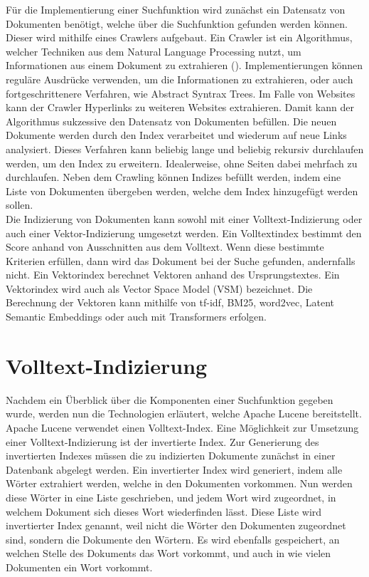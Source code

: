 Für die Implementierung einer Suchfunktion wird zunächst ein Datensatz von Dokumenten benötigt, welche über die Suchfunktion gefunden werden können.
Dieser wird mithilfe eines Crawlers aufgebaut.
Ein Crawler ist ein Algorithmus, welcher Techniken aus dem Natural Language Processing nutzt, um Informationen aus einem Dokument zu extrahieren (\cite{Khder_2021}).
Implementierungen können reguläre Ausdrücke verwenden, um die Informationen zu extrahieren, oder auch fortgeschrittenere Verfahren, wie Abstract Syntrax Trees.
Im Falle von Websites kann der Crawler Hyperlinks zu weiteren Websites extrahieren.
Damit kann der Algorithmus sukzessive den Datensatz von Dokumenten befüllen.
Die neuen Dokumente werden durch den Index verarbeitet und wiederum auf neue Links analysiert.
Dieses Verfahren kann beliebig lange und beliebig rekursiv durchlaufen werden, um den Index zu erweitern.
Idealerweise, ohne Seiten dabei mehrfach zu durchlaufen.
Neben dem Crawling können Indizes befüllt werden, indem eine Liste von Dokumenten übergeben werden, welche dem Index hinzugefügt werden sollen.\\

Die Indizierung von Dokumenten kann sowohl mit einer Volltext-Indizierung oder auch einer Vektor-Indizierung umgesetzt werden.
Ein Volltextindex bestimmt den Score anhand von Ausschnitten aus dem Volltext.
Wenn diese bestimmte Kriterien erfüllen, dann wird das Dokument bei der Suche gefunden, andernfalls nicht.
Ein Vektorindex berechnet Vektoren anhand des Ursprungstextes.
Ein Vektorindex wird auch als Vector Space Model (VSM) bezeichnet.
Die Berechnung der Vektoren kann mithilfe von tf-idf, BM25, word2vec, Latent Semantic Embeddings oder auch mit Transformers erfolgen.


\section{Volltext-Indizierung}
\label{chap:volltext-indizierung}
Nachdem ein Überblick über die Komponenten einer Suchfunktion gegeben wurde, werden nun die Technologien erläutert, welche Apache Lucene bereitstellt.
Apache Lucene verwendet einen Volltext-Index.
Eine Möglichkeit zur Umsetzung einer Volltext-Indizierung ist der invertierte Index.
Zur Generierung des invertierten Indexes müssen die zu indizierten Dokumente zunächst in einer Datenbank abgelegt werden.
Ein invertierter Index wird generiert, indem alle Wörter extrahiert werden, welche in den Dokumenten vorkommen.
Nun werden diese Wörter in eine Liste geschrieben, und jedem Wort wird zugeordnet, in welchem Dokument sich dieses Wort wiederfinden lässt.
Diese Liste wird invertierter Index genannt, weil nicht die Wörter den Dokumenten zugeordnet sind, sondern die Dokumente den Wörtern.
Es wird ebenfalls gespeichert, an welchen Stelle des Dokuments das Wort vorkommt, und auch in wie vielen Dokumenten ein Wort vorkommt.\\

